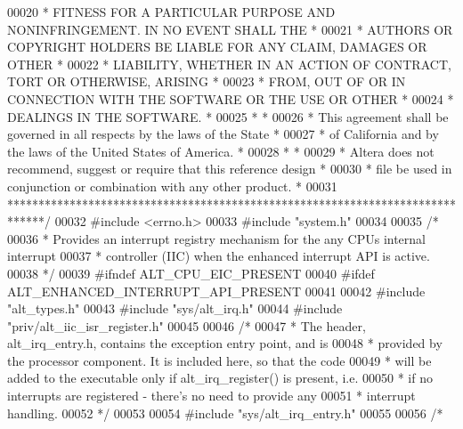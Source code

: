 \begin{DoxyCode}
00020 \textcolor{comment}{* FITNESS FOR A PARTICULAR PURPOSE AND NONINFRINGEMENT. IN NO EVENT SHALL THE *}
00021 \textcolor{comment}{* AUTHORS OR COPYRIGHT HOLDERS BE LIABLE FOR ANY CLAIM, DAMAGES OR OTHER      *}
00022 \textcolor{comment}{* LIABILITY, WHETHER IN AN ACTION OF CONTRACT, TORT OR OTHERWISE, ARISING     *}
00023 \textcolor{comment}{* FROM, OUT OF OR IN CONNECTION WITH THE SOFTWARE OR THE USE OR OTHER         *}
00024 \textcolor{comment}{* DEALINGS IN THE SOFTWARE.                                                   *}
00025 \textcolor{comment}{*                                                                             *}
00026 \textcolor{comment}{* This agreement shall be governed in all respects by the laws of the State   *}
00027 \textcolor{comment}{* of California and by the laws of the United States of America.              *}
00028 \textcolor{comment}{*                                                                             *}
00029 \textcolor{comment}{* Altera does not recommend, suggest or require that this reference design    *}
00030 \textcolor{comment}{* file be used in conjunction or combination with any other product.          *}
00031 \textcolor{comment}{******************************************************************************/}
00032 \textcolor{preprocessor}{#include <errno.h>}
00033 \textcolor{preprocessor}{#include "system.h"}
00034 
00035 \textcolor{comment}{/*}
00036 \textcolor{comment}{ * Provides an interrupt registry mechanism for the any CPUs internal interrupt}
00037 \textcolor{comment}{ * controller (IIC) when the enhanced interrupt API is active.}
00038 \textcolor{comment}{ */}
00039 \textcolor{preprocessor}{#ifndef ALT\_CPU\_EIC\_PRESENT}
00040 \textcolor{preprocessor}{#ifdef ALT\_ENHANCED\_INTERRUPT\_API\_PRESENT}
00041 
00042 \textcolor{preprocessor}{#include "alt_types.h"}
00043 \textcolor{preprocessor}{#include "sys/alt_irq.h"}
00044 \textcolor{preprocessor}{#include "priv/alt_iic_isr_register.h"}
00045 
00046 \textcolor{comment}{/*}
00047 \textcolor{comment}{ * The header, alt\_irq\_entry.h, contains the exception entry point, and is}
00048 \textcolor{comment}{ * provided by the processor component. It is included here, so that the code}
00049 \textcolor{comment}{ * will be added to the executable only if alt\_irq\_register() is present, i.e.}
00050 \textcolor{comment}{ * if no interrupts are registered - there's no need to provide any }
00051 \textcolor{comment}{ * interrupt handling.}
00052 \textcolor{comment}{ */}
00053 
00054 \textcolor{preprocessor}{#include "sys/alt_irq_entry.h"}
00055 
00056 \textcolor{comment}{/*}

\end{DoxyCode}
